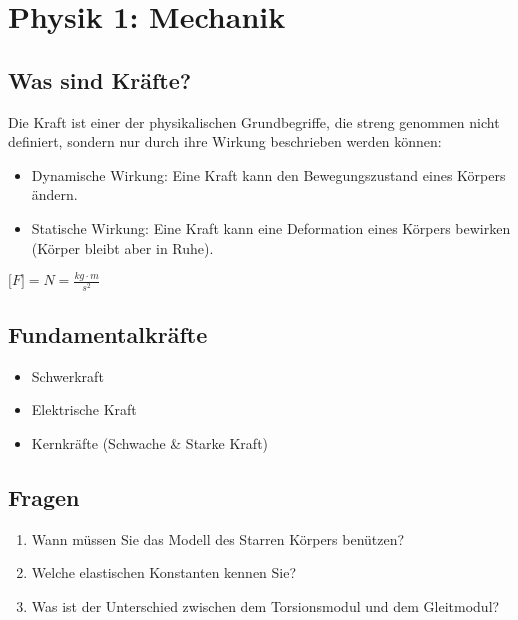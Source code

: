\section{Physik 1: Mechanik}

\subsection{Was sind Kräfte?}
Die Kraft ist einer der physikalischen Grundbegriffe, die streng genommen nicht 
definiert, sondern nur durch ihre Wirkung beschrieben werden können:
\begin{itemize}
\item Dynamische Wirkung: Eine Kraft kann den Bewegungszustand eines Körpers ändern.
\item Statische Wirkung: Eine Kraft kann eine Deformation eines Körpers bewirken (Körper bleibt aber in Ruhe).
\end{itemize}

$\lbrack F \rbrack =  N = \frac{kg \cdot m}{s^2}$

\subsection{Fundamentalkräfte}
\begin{itemize}
	\item Schwerkraft
	\item Elektrische Kraft
	\item Kernkräfte (Schwache \& Starke Kraft)
\end{itemize}

\subsection{Fragen}
\begin{enumerate}
	\item Wann müssen Sie das Modell des Starren Körpers benützen? \\
	\item Welche elastischen Konstanten kennen Sie?
	\item Was ist der Unterschied zwischen dem Torsionsmodul und 
	dem Gleitmodul?
\end{enumerate}
